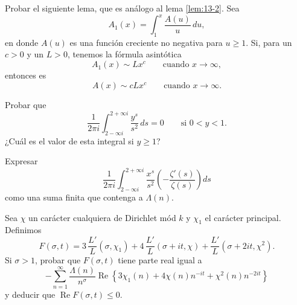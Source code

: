     \begin{ejercicio}
        Probar el siguiente lema, que es análogo al lema \ref{lem:13-2}. Sea
        \begin{equation*}
            A_1(x)=\int_1^x\frac{A(u)}{u}\,du,
        \end{equation*}
        en donde $A(u)$ es una función creciente no negativa para $u\geq1$. Si, para un $c>0$ y
        un $L>0$, tenemos la fórmula asintótica
        \begin{equation*}
            A_1(x)\sim Lx^c\qquad\text{cuando }x\to\infty,
        \end{equation*}
        entonces es
        \begin{equation*}
            A(x)\sim cLx^c\qquad\text{cuando }x\to\infty.
        \end{equation*}
    \end{ejercicio}

    \begin{ejercicio}
        Probar que
        \begin{equation*}
            \frac{1}{2\pi i}\int_{2-\infty i}^{2+\infty i}\frac{y^s}{s^2}\,ds=0\qquad\text{si }0<y<1.
        \end{equation*}
        ¿Cuál es el valor de esta integral si $y\geq1$?
    \end{ejercicio}

    \begin{ejercicio}
        Expresar
        \begin{equation*}
            \frac{1}{2\pi i}\int_{2-\infty i}^{2+\infty i}\frac{x^s}{s^2}\left(-\frac{\zeta'(s)}{\zeta(s)}\right)ds
        \end{equation*}
        como una suma finita que contenga a $\Lambda(n)$.
    \end{ejercicio}

    \begin{ejercicio}
        Sea $\chi$ un carácter cualquiera de Dirichlet mód $k$ y $\chi_1$ el carácter principal.
        Definimos
        \begin{equation*}
            F(\sigma,t)=3\,\frac{L'}{L}(\sigma,\chi_1)+4\,\frac{L'}{L}(\sigma+it,\chi)+\frac{L'}{L}(\sigma+2it,\chi^2).
        \end{equation*}
        Si $\sigma>1$, probar que $F(\sigma,t)$ tiene parte real igual a
        \begin{equation*}
            -\sum_{n=1}^{\infty}\frac{\Lambda(n)}{n^{\sigma}}\operatorname{Re}\left\{3\chi_1(n)+4\chi(n)n^{-it}+\chi^2(n)n^{-2it}\right\}
        \end{equation*}
        y deducir que $\operatorname{Re}F(\sigma,t)\leq0$.
    \end{ejercicio}

